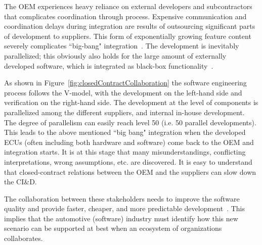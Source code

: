 The OEM experiences heavy reliance on external developers and subcontractors that complicates coordination through process. Expensive communication and coordination delays during integration are results of outsourcing significant parts of development to suppliers. This form of exponentially growing feature content severely complicates ``big-bang" integration~\cite{Eklund2012}. The development is inevitably parallelized; this obviously also holds for the large amount of externally developed software, which is integrated as black-box functionality~\cite{Patrizio2016AAF_Chalmers,Broy2009AAF_TUM,Broy:2006:CAS:1134285.1134292}. 

As shown in Figure~\ref{fig:closedContractCollaboration} the software engineering process follows the V-model, with the development on the left-hand side and verification on the right-hand side. The development at the level of components is parallelized among the different suppliers, and internal in-house development. The degree of parallelism can easily reach level 50 (i.e. 50 parallel developments). This leads to the above mentioned ``big bang" integration when the developed ECUs  (often including both hardware and software) come back to the OEM and integration starts. It is at this stage that many misunderstandings, conflicting interpretations, wrong assumptions, etc. are discovered.
It is easy to understand that closed-contract relations between the OEM and the suppliers can slow down the CI\&D. 

The collaboration between these stakeholders needs to improve the software quality and provide faster, cheaper, and more predictable development~\cite{herbsleb2016IntelligentTransparent}. This implies that the automotive (software) industry must identify how this new scenario can be supported at best when an ecosystem of organizations collaborates.


